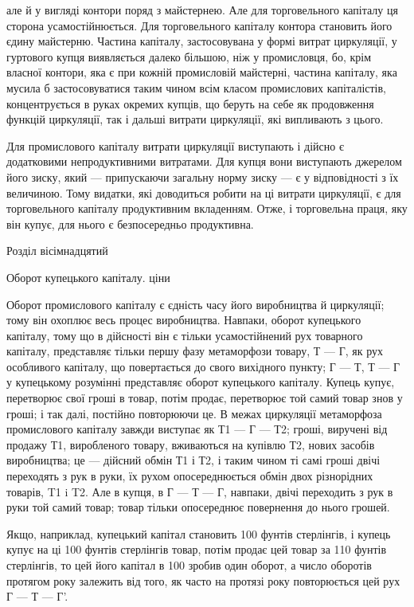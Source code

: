 але й у вигляді контори поряд з майстернею. Але для торговельного
капіталу ця сторона усамостійнюється. Для торговельного
капіталу контора становить його єдину майстерню. Частина
капіталу, застосовувана у формі витрат циркуляції, у гуртового
купця виявляється далеко більшою, ніж у промисловця, бо, крім
власної контори, яка є при кожній промисловій майстерні, частина
капіталу, яка мусила б застосовуватися таким чином всім
класом промислових капіталістів, концентрується в руках окремих
купців, що беруть на себе як продовження функцій циркуляції,
так і дальші витрати циркуляції, які випливають з цього.

Для промислового капіталу витрати циркуляції виступають
і дійсно є додатковими непродуктивними витратами. Для купця
вони виступають джерелом його зиску, який — припускаючи загальну
норму зиску — є у відповідності з їх величиною. Тому
видатки, які доводиться робити на ці витрати циркуляції, є для
торговельного капіталу продуктивним вкладенням. Отже, і торговельна
праця, яку він купує, для нього є безпосередньо
продуктивна.

Розділ вісімнадцятий

Оборот купецького капіталу. ціни

Оборот промислового капіталу є єдність часу його виробництва
й циркуляції; тому він охоплює весь процес виробництва.
Навпаки, оборот купецького капіталу, тому що в дійсності
він є тільки усамостійнений рух товарного капіталу, представляє
тільки першу фазу метаморфози товару, Т — Г, як рух
особливого капіталу, що повертається до свого вихідного пункту;
Г — Т, Т — Г у купецькому розумінні представляє оборот купецького
капіталу. Купець купує, перетворює свої гроші в товар, потім
продає, перетворює той самий товар знов у гроші; і так далі,
постійно повторюючи це. В межах циркуляції метаморфоза промислового
капіталу завжди виступає як Т1 — Г — Т2; гроші, виручені
від продажу Т1, виробленого товару, вживаються на
купівлю Т2, нових засобів виробництва; це — дійсний обмін Т1
і Т2, і таким чином ті самі гроші двічі переходять з рук в руки,
їх рухом опосереднюється обмін двох різнорідних товарів, T1 i T2.
Але в купця, в Г — Т — Г, навпаки, двічі переходить з рук
в руки той самий товар; товар тільки опосереднює повернення
до нього грошей.

Якщо, наприклад, купецький капітал становить 100 фунтів
стерлінгів, і купець купує на ці 100 фунтів стерлінгів товар,
потім продає цей товар за 110 фунтів стерлінгів, то цей його
капітал в 100 зробив один оборот, а число оборотів протягом
року залежить від того, як часто на протязі року повторюється
цей рух Г — Т — Г'.
